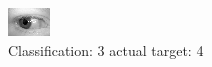 \begin{figure}[h!]
\begin{center}
\includegraphics[width=0.60\columnwidth]{figures/ID708_class_3_target_4.png}
\end{center}
\caption{ Classification: 3 actual target: 4}
\label{fig:ID708_class_3_target_4}
\end{figure}
